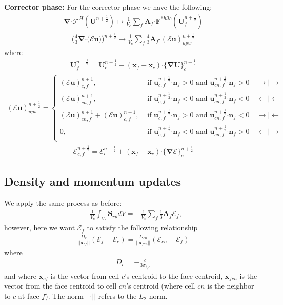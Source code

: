 \documentclass[10pt,letterpaper,notitlepage]{article}
\numberwithin{equation}{section}
\newcommand{\bnabla}{\boldsymbol{\nabla}}
\newcommand{\position}{\mathbf{x}}
\newcommand{\velocity}{\mathbf{u}}
\newcommand{\dotp}{\boldsymbol{\cdot}}
\newcommand{\RadE}{\mathcal{E}}
\newcommand{\HydroF}{\mathcal{F}^H}
\newcommand{\HydroU}{\mathbf{U}}
\newcommand{\AreaVec}{\mathbf{A}}
\newcommand{\NormalVec}{\mathbf{n}}
\newcommand{\half}{\frac{1}{2}}
\newcommand{\beqn}{\begin{equation}\begin{aligned}}
\newcommand{\eeqn}{\end{aligned}\end{equation}}
\begin{document}
\noindent
\textbf{Corrector phase:}\newline
For the corrector phase we have the following:
\beqn 
\bnabla \dotp \HydroF (\HydroU^{n+\half})
\mapsto 
\frac{1}{V_c}
\sum_f \AreaVec_f \dotp  \mathbf{F}^{*hllc}(\HydroU_f^{n+\half})
\eeqn 
\beqn 
\biggr(\frac{4}{3} \bnabla \dotp \bigr(\RadE \velocity)\biggr)^{n+\half}
\mapsto 
\frac{1}{V_c}
\sum_f \frac{4}{3}  \AreaVec_f \dotp (\RadE \velocity)_{upw}^{n+\half}
\eeqn 
where
\beqn 
\HydroU_f^{n+\half} = \HydroU_c^{n+\half}+ (\position_f - \position_c) \dotp \{ \bnabla\HydroU \}_c^{n+\half}
\eeqn  
\beqn
(\RadE \velocity)_{upw}^{n+\half} =
\begin{cases}
(\RadE \velocity)_{c,f}^{n+1} , &\text{ if } 
\velocity_{c,f}^{n+\half} \dotp  \NormalVec_f > 0 \text{ and } \velocity_{cn,f}^{n+\half} \dotp  \NormalVec_f > 0 
\quad  \rightarrow | \rightarrow \\
(\RadE \velocity)_{cn,f}^{n+1} , &\text{ if } 
\velocity_{c,f}^{n+\half} \dotp  \NormalVec_f < 0 \text{ and } \velocity_{cn,f}^{n+\half} \dotp  \NormalVec_f < 0
\quad  \leftarrow | \leftarrow \\
(\RadE \velocity)_{cn,f}^{n+1} + (\RadE \velocity)_{c,f}^{n+1}, &\text{ if } 
\velocity_{c,f}^{n+\half} \dotp  \NormalVec_f > 0 \text{ and } \velocity_{cn,f}^{n+\half} \dotp  \NormalVec_f < 0 
\quad  \rightarrow | \leftarrow \\
0, &\text{ if } 
\velocity_{c,f}^{n+\half} \dotp  \NormalVec_f < 0 \text{ and } \velocity_{cn,f}^{n+\half} \dotp  \NormalVec_f > 0
\quad  \leftarrow | \rightarrow \\
\end{cases}
\eeqn 
\beqn 
\RadE_{c,f}^{n+\half} = \RadE_c^{n+\half} + (\position_f - \position_c) \dotp \{ \bnabla\RadE \}_c^{n+\half}
\eeqn

\newpage
\subsection{Density and momentum updates}
We apply the same process as before:
\beqn 
-\frac{1}{V_c} \int_{V_c} \mathbf{S}_{rp} dV = -\frac{1}{V_c}  \sum_f \frac{1}{3} \AreaVec_f \RadE_f,
\eeqn 
however, here we want $\RadE_f$ to satisfy the following relationship
\beqn 
\frac{D_c}{||\position_{cf}||} (\RadE_f - \RadE_c) = 
\frac{D_{cn}}{||\position_{fcn}||} (\RadE_{cn} - \RadE_f) 
\eeqn 
where
\beqn 
D_c = -\frac{c}{3\sigma_{t,c}}
\eeqn 
and where $\position_{cf}$ is the vector from cell $c$'s centroid to the face centroid, $\position_{fcn}$ is the vector from the face centroid to cell $cn$'s centroid (where cell $cn$ is the neighbor to $c$ at face $f$). The norm $||\dotp||$ refers to the $L_2$ norm.
\end{document}
